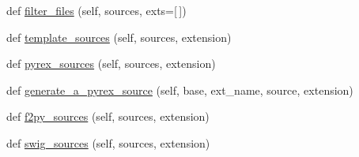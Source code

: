 \begin{DoxyCompactItemize}
\item 
def \hyperlink{classnumpy_1_1distutils_1_1command_1_1build__src_1_1build__src_ab66b3642ae519c89d03784a5d1df4e86}{filter\+\_\+files} (self, sources, exts=\mbox{[}$\,$\mbox{]})
\item 
def \hyperlink{classnumpy_1_1distutils_1_1command_1_1build__src_1_1build__src_aa29def9287df6f3ea7c1e18523d8908b}{template\+\_\+sources} (self, sources, extension)
\item 
def \hyperlink{classnumpy_1_1distutils_1_1command_1_1build__src_1_1build__src_af3dfd182cb6dd36e8a161620c5fe4f60}{pyrex\+\_\+sources} (self, sources, extension)
\item 
def \hyperlink{classnumpy_1_1distutils_1_1command_1_1build__src_1_1build__src_ab9edd0127b20f420310962d6a164f5cd}{generate\+\_\+a\+\_\+pyrex\+\_\+source} (self, base, ext\+\_\+name, source, extension)
\item 
def \hyperlink{classnumpy_1_1distutils_1_1command_1_1build__src_1_1build__src_a8bc47c5a617002b2fbc8eae45b726aba}{f2py\+\_\+sources} (self, sources, extension)
\item 
def \hyperlink{classnumpy_1_1distutils_1_1command_1_1build__src_1_1build__src_a4540e2c21822263575d0e06ee638c3e3}{swig\+\_\+sources} (self, sources, extension)
\end{DoxyCompactItemize}

